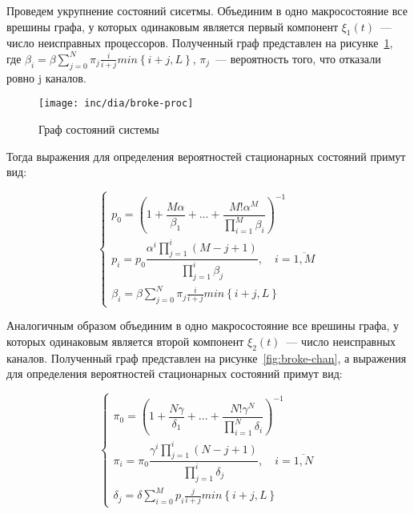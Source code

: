 Проведем укрупнение состояний сисетмы. Объединим в одно макросостояние все врешины графа, у которых одинаковым является первый компонент $\xi_{1}(t)$~--- число неисправных процессоров. Полученный граф представлен на рисунке~\ref{fig:broke-proc}, где $\beta_i=\beta\sum\limits_{j=0}^N\pi_j\frac{i}{i+j}min\left\lbrace i+j,L\right\rbrace$, $\pi_j$~--- вероятность того, что отказали ровно j каналов.

\begin{figure}[ht]
\centering
\texttt{[image: inc/dia/broke-proc]}
\caption{Граф состояний системы}
\label{fig:broke-proc}
\end{figure}

Тогда выражения для определения вероятностей стационарных состояний примут вид:

\begin{equation}
\label{eq:broke-proc}
\left\{
   \begin{array}{lcl}
	p_{0} = \left( 1 + \dfrac{M \alpha}{\beta_1} +  ... + \dfrac{M! \alpha^{M}}{\prod \limits_{i=1}^M \beta_i} \right) ^{-1} \\
	p_{i} = p_{0} \dfrac{\alpha^{i}\prod \limits_{j=1}^{i} (M-j+1)}{\prod \limits_{j=1}^i \beta_{j}}, \quad i = \overline{1,M}  \\ 
	\beta_i=\beta\sum\limits_{j=0}^N\pi_j\frac{i}{i+j}min\left\lbrace i+j,L\right\rbrace
   \end{array}
\right.
\end{equation}
 
Аналогичным образом объединим в одно макросостояние все врешины графа, у которых одинаковым является второй компонент $\xi_{2}(t)$~--- число неисправных каналов. Полученный граф представлен на рисунке~\ref{fig:broke-chan}, а выражения для определения вероятностей стационарных состояний примут вид:

\begin{equation}
\label{eq:broke-chan}
\left\{
   \begin{array}{lcl}
	\pi_{0} = \left( 1 + \dfrac{N \gamma}{\delta_1} +  ... + \dfrac{N! \gamma^{N}}{\prod \limits_{i=1}^N \delta_i} \right) ^{-1} \\
	\pi_{i} = \pi_{0} \dfrac{\gamma^{i}\prod \limits_{j=1}^{i} (N-j+1)}{\prod \limits_{j=1}^i \delta_{j}}, \quad i = \overline{1,N}  \\ 
	\delta_j=\delta\sum\limits_{i=0}^M p_i\frac{j}{i+j}min\left\lbrace i+j,L\right\rbrace
   \end{array}
\right.
\end{equation}

